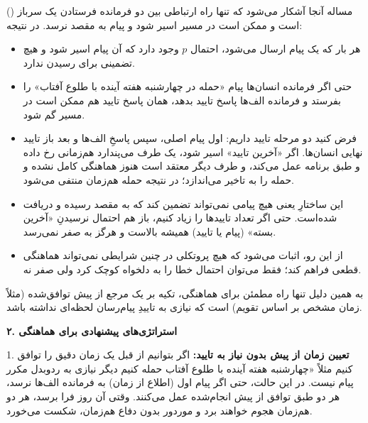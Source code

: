 مساله آنجا آشکار می‌شود که تنها راه ارتباطی بین دو فرمانده فرستادن یک سرباز () است و ممکن است در مسیر اسیر شود و پیام به مقصد نرسد. در نتیجه:
\begin{itemize}
    \item هر بار که یک پیام ارسال می‌شود، احتمال \(p\) وجود دارد که آن پیام اسیر شود و هیچ تضمینی برای رسیدن ندارد.
    \item حتی اگر فرمانده انسان‌ها پیام «حمله در چهارشنبه هفته آینده با طلوع آفتاب» را بفرستد و فرمانده الف‌ها پاسخ تایید بدهد، همان پاسخ تایید هم ممکن است در مسیر گم شود.
    \item فرض کنید دو مرحله تایید داریم: اول پیام اصلی، سپس پاسخِ الف‌ها و بعد باز تایید نهایی انسان‌ها. اگر «آخرین تایید» اسیر شود، یک طرف می‌پندارد هم‌زمانی رخ داده و طبق برنامه عمل می‌کند، و طرف دیگر معتقد است هنوز هماهنگی کامل نشده و حمله را به تاخیر می‌اندازد؛ در نتیجه حمله هم‌زمان منتفی می‌شود.
    \item این ساختارِ  یعنی هیچ پیامی نمی‌تواند تضمین کند که به مقصد رسیده و دریافت‌ شده‌است. حتی اگر تعداد تاییدها را زیاد کنیم، باز هم احتمال نرسیدنِ «آخرین بسته» (پیام یا تایید) همیشه بالاست و هرگز به صفر نمی‌رسد.
    \item از این رو، اثبات می‌شود که هیچ پروتکلی در چنین شرایطی نمی‌تواند هماهنگی قطعی فراهم کند؛ فقط می‌توان احتمال خطا را به دلخواه کوچک کرد ولی صفر نه.
\end{itemize}

\noindent
به همین دلیل تنها راه مطمئن برای هماهنگی، تکیه بر یک مرجع از پیش توافق‌شده (مثلاً زمان مشخص بر اساس تقویم) است که نیازی به تاییدِ پیام‌‌رسان لحظه‌ای نداشته باشد.

\bigskip

\noindent
\textbf{۲. استراتژی‌های پیشنهادی برای هماهنگی}

1. \textbf{تعیین زمان از پیش بدون نیاز به تایید:}  
   اگر بتوانیم از قبل یک زمان دقیق را توافق کنیم مثلاً «چهارشنبه هفته آینده با طلوع آفتاب حمله کنیم  دیگر نیازی به ردوبدل مکرر پیام نیست. در این حالت، حتی اگر پیام اول (اطلاع از زمان) به فرمانده الف‌ها نرسد، هر دو طبق توافق از پیش انجام‌شده عمل می‌کنند. وقتی آن روز فرا برسد، هر دو هم‌زمان هجوم خواهند برد و موردور بدون دفاع هم‌زمان، شکست می‌خورد.

